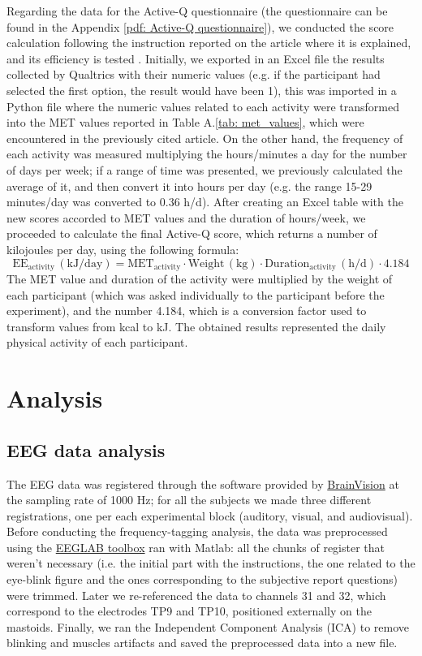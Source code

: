 Regarding the data for the Active-Q questionnaire (the questionnaire can be found in the Appendix \ref{pdf: Active-Q questionnaire}), we conducted the score calculation following the instruction reported on the article where it is explained, and its efficiency is tested \parencite{Bonn_2012}. Initially, we exported in an Excel file the results collected by Qualtrics with their numeric values (e.g. if the participant had selected the first option, the result would have been 1), this was imported in a Python file where the numeric values related to each activity were transformed into the MET values reported in Table A.\ref{tab: met_values}, which were encountered in the previously cited article. On the other hand, the frequency of each activity was measured multiplying the hours/minutes a day for the number of days per week; if a range of time was presented, we previously calculated the average of it, and then convert it into hours per day (e.g. the range 15-29 minutes/day was converted to 0.36 h/d).  
After creating an Excel table with the new scores accorded to MET values and the duration of hours/week, we proceeded to calculate the final Active-Q score, which returns a number of kilojoules per day, using the following formula: 
\[
\text{EE}_{\text{activity}} \, (\text{kJ/day}) = \text{MET}_{\text{activity}} \cdot \text{Weight} \, (\text{kg}) \cdot \text{Duration}_{\text{activity}} \, (\text{h/d}) \cdot 4.184
\]
The MET value and duration of the activity were multiplied by the weight of each participant (which was asked individually to the participant before the experiment), and the number 4.184, which is a conversion factor used to transform values from kcal to kJ. The obtained results represented the daily physical activity of each participant.

\section{Analysis}
\subsection{EEG data analysis}
The EEG data was registered through the software provided by \href{https://brainvision.com/applications/brain-vision-software/}{BrainVision} at the sampling rate of 1000 Hz; for all the subjects we made three different registrations, one per each experimental block (auditory, visual, and audiovisual). 
Before conducting the frequency-tagging analysis, the data was preprocessed using the \href{https://eeglab.org/}{EEGLAB toolbox} ran with Matlab: all the chunks of register that weren't necessary (i.e. the initial part with the instructions, the one related to the eye-blink figure and the ones corresponding to the subjective report questions) were trimmed. Later we re-referenced the data to channels 31 and 32, which correspond to the electrodes TP9 and TP10, positioned externally on the mastoids. Finally, we ran the Independent Component Analysis (ICA) to remove blinking and muscles artifacts and saved the preprocessed data into a new file. 

